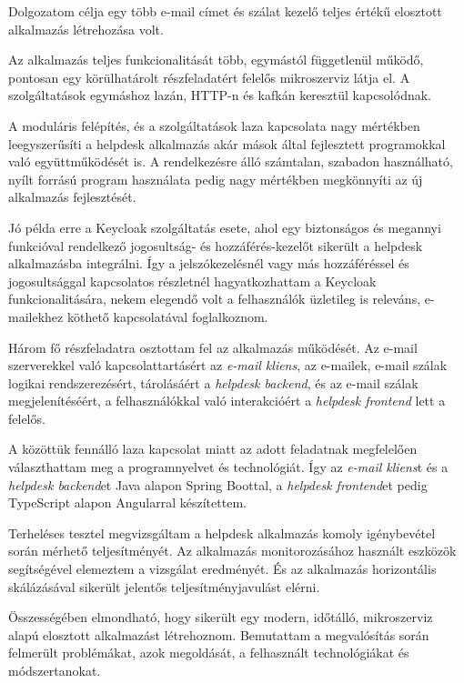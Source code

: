 Dolgozatom célja egy több e-mail címet és szálat kezelő teljes értékű elosztott alkalmazás létrehozása volt.

\bigskip
Az alkalmazás teljes funkcionalitását több, egymástól függetlenül működő, pontosan egy körülhatárolt részfeladatért felelős mikroszerviz látja el. A szolgáltatások egymáshoz lazán, HTTP-n és kafkán keresztül kapcsolódnak.

A moduláris felépítés, és a szolgáltatások laza kapcsolata nagy mértékben leegyszerűsíti a helpdesk alkalmazás akár mások által fejlesztett programokkal való együttműködését is. A rendelkezésre álló számtalan, szabadon használható, nyílt forrású program használata pedig nagy mértékben megkönnyíti az új alkalmazás fejlesztését.

Jó példa erre a Keycloak szolgáltatás esete, ahol egy biztonságos és megannyi funkcióval rendelkező jogosultság- és hozzáférés-kezelőt sikerült a helpdesk alkalmazásba integrálni. Így a jelszókezelésnél vagy más hozzáféréssel és jogosultsággal kapcsolatos részletnél hagyatkozhattam a Keycloak funkcionalitására, nekem elegendő volt a felhasználók üzletileg is releváns, e-mailekhez köthető kapcsolatával foglalkoznom.

\bigskip
Három fő részfeladatra osztottam fel az alkalmazás működését. Az e-mail szerverekkel való kapcsolattartásért az \textit{e-mail kliens}, az e-mailek, e-mail szálak logikai rendszerezésért, tárolásáért a \textit{helpdesk backend}, és az e-mail szálak megjelenítéséért, a felhasználókkal való interakcióért a \textit{helpdesk frontend} lett a felelős.

A közöttük fennálló laza kapcsolat miatt az adott feladatnak megfelelően választhattam meg a programnyelvet és technológiát. Így az \textit{e-mail kliens}t és a \textit{helpdesk backend}et Java alapon Spring Boottal, a \textit{helpdesk frontend}et pedig TypeScript alapon Angularral készítettem.


\bigskip
Terheléses tesztel megvizsgáltam a helpdesk alkalmazás komoly igénybevétel során mérhető teljesítményét. Az alkalmazás monitorozásához használt eszközök segítségével elemeztem a vizsgálat eredményét. És az alkalmazás horizontális skálázásával sikerült jelentős teljesítményjavulást elérni.

\pagebreak
Összességében elmondható, hogy sikerült egy modern, időtálló, mikroszerviz alapú elosztott alkalmazást létrehoznom. Bemutattam a megvalósítás során felmerült problémákat, azok megoldását, a felhasznált technológiákat és módszertanokat.
